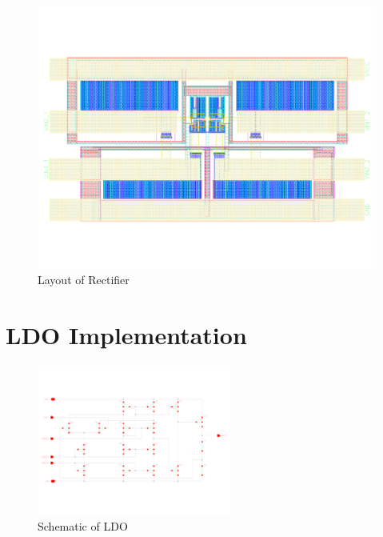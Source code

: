 \begin{appendices}
\begin{figure} [!htbp] %
 	\centering
  	\includegraphics[width=\textwidth]{appendix/layout_rectifier_l.pdf} 
 	\caption{Layout of Rectifier} 
	\label{fig:appen_layout_rectifer} 
\end{figure}


\chapter{LDO Implementation}

\begin{figure} [!htbp]	%
 	\centering
  	\includegraphics[angle=90, width=0.57\textwidth]{appendix/schematic_ldo_l.pdf} 
 	\caption{Schematic of LDO} 
	\label{fig:appen_schematic_ldo} 
\end{figure}


\end{appendices}
